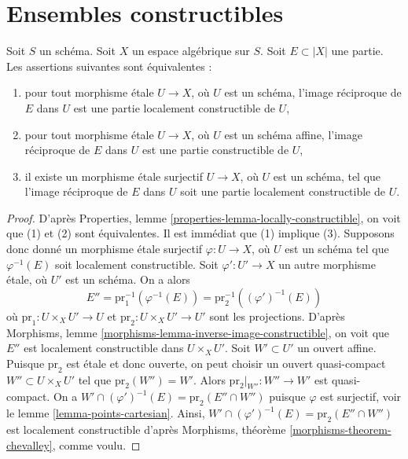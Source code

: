\section{Ensembles constructibles}
\label{section-constructible}

\begin{lemma}
\label{lemma-locally-constructible}
Soit $S$ un schéma. Soit $X$ un espace algébrique sur $S$.
Soit $E \subset |X|$ une partie. Les assertions suivantes sont équivalentes :
\begin{enumerate}
\item pour tout morphisme \'etale $U \to X$, où $U$ est un
schéma, l'image réciproque de $E$ dans $U$ est une partie localement constructible
de $U$,
\item pour tout morphisme \'etale $U \to X$, où $U$ est un
schéma affine, l'image réciproque de $E$ dans $U$ est une partie constructible
de $U$,
\item il existe un morphisme \'etale surjectif $U \to X$, où $U$ est un
schéma, tel que l'image réciproque de $E$ dans $U$ soit une partie localement constructible
de $U$.
\end{enumerate}
\end{lemma}

\begin{proof}
D'après Properties, lemme \ref{properties-lemma-locally-constructible},
on voit que (1) et (2) sont équivalentes. Il est immédiat que (1)
implique (3). Supposons donc donné un morphisme \'etale surjectif
$\varphi : U \to X$, où $U$ est un schéma tel que $\varphi^{-1}(E)$
soit localement constructible. Soit $\varphi' : U' \to X$ un autre
morphisme \'etale, où $U'$ est un schéma. On a alors
$$
E'' = \text{pr}_1^{-1}(\varphi^{-1}(E)) = \text{pr}_2^{-1}((\varphi')^{-1}(E))
$$
où $\text{pr}_1 : U \times_X U' \to U$ et
$\text{pr}_2 : U \times_X U' \to U'$ sont les projections.
D'après Morphisms, lemme \ref{morphisms-lemma-inverse-image-constructible},
on voit que $E''$ est localement constructible dans $U \times_X U'$.
Soit $W' \subset U'$ un ouvert affine. Puisque $\text{pr}_2$ est
\'etale et donc ouverte, on peut choisir un ouvert quasi-compact
$W'' \subset U \times_X U'$ tel que $\text{pr}_2(W'') = W'$.
Alors $\text{pr}_2|_{W''} : W'' \to W'$ est quasi-compact.
On a $W' \cap (\varphi')^{-1}(E) = \text{pr}_2(E'' \cap W'')$
puisque $\varphi$ est surjectif, voir le lemme \ref{lemma-points-cartesian}.
Ainsi, $W' \cap (\varphi')^{-1}(E) = \text{pr}_2(E'' \cap W'')$
est localement constructible d'après
Morphisms, théorème \ref{morphisms-theorem-chevalley}, comme voulu.
\end{proof}


